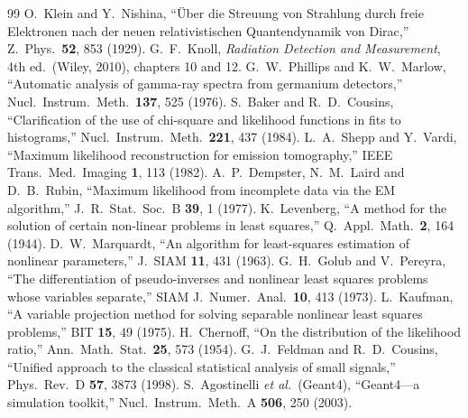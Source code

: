 \documentclass[11pt]{article}
\begin{document}
\begin{thebibliography}{99}
 O.~Klein and Y.~Nishina, ``\"Uber die Streuung von Strahlung durch freie Elektronen nach der neuen relativistischen Quantendynamik von Dirac,'' Z.~Phys.\ \textbf{52}, 853 (1929).
 G.~F.~Knoll, \emph{Radiation Detection and Measurement}, 4th ed.\ (Wiley, 2010), chapters 10 and 12.
 G.~W.~Phillips and K.~W.~Marlow, ``Automatic analysis of gamma-ray spectra from germanium detectors,'' Nucl.\ Instrum.\ Meth.\ \textbf{137}, 525 (1976).
 S.~Baker and R.~D.~Cousins, ``Clarification of the use of chi-square and likelihood functions in fits to histograms,'' Nucl.\ Instrum.\ Meth.\ \textbf{221}, 437 (1984).
 L.~A.~Shepp and Y.~Vardi, ``Maximum likelihood reconstruction for emission tomography,'' IEEE Trans.\ Med.\ Imaging \textbf{1}, 113 (1982).
 A.~P.~Dempster, N.~M.~Laird and D.~B.~Rubin, ``Maximum likelihood from incomplete data via the EM algorithm,'' J.~R.\ Stat.\ Soc.\ B \textbf{39}, 1 (1977).
 K.~Levenberg, ``A method for the solution of certain non-linear problems in least squares,'' Q.~Appl.\ Math.\ \textbf{2}, 164 (1944).
 D.~W.~Marquardt, ``An algorithm for least-squares estimation of nonlinear parameters,'' J.~SIAM \textbf{11}, 431 (1963).
 G.~H.~Golub and V.~Pereyra, ``The differentiation of pseudo-inverses and nonlinear least squares problems whose variables separate,'' SIAM J.\ Numer.\ Anal.\ \textbf{10}, 413 (1973).
 L.~Kaufman, ``A variable projection method for solving separable nonlinear least squares problems,'' BIT \textbf{15}, 49 (1975).
 H.~Chernoff, ``On the distribution of the likelihood ratio,'' Ann.\ Math.\ Stat.\ \textbf{25}, 573 (1954).
 G.~J.~Feldman and R.~D.~Cousins, ``Unified approach to the classical statistical analysis of small signals,'' Phys.\ Rev.\ D \textbf{57}, 3873 (1998).
 S.~Agostinelli \emph{et al.}\ (Geant4), ``Geant4---a simulation toolkit,'' Nucl.\ Instrum.\ Meth.\ A \textbf{506}, 250 (2003).
\end{thebibliography}
\end{document}

